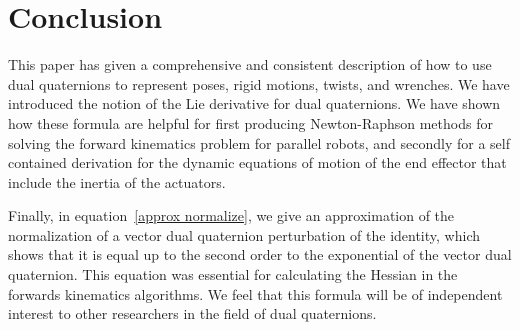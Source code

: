\documentclass[reqno,12pt]{amsart}
\begin{document}
\section{Conclusion}

This paper has given a comprehensive and consistent description of how to use dual quaternions to represent poses, rigid motions, twists, and wrenches.  We have introduced the notion of the Lie derivative for dual quaternions.  We have shown how these formula are helpful for first producing Newton-Raphson methods for solving the forward kinematics problem for parallel robots, and secondly for a self contained derivation for the dynamic equations of motion of the end effector that include the inertia of the actuators.

Finally, in equation~\eqref{approx normalize}, we give an approximation of the normalization of a vector dual quaternion perturbation of the identity, which shows that it is equal up to the second order to the exponential of the vector dual quaternion.  This equation was essential for calculating the Hessian in the forwards kinematics algorithms.  We feel that this formula will be of independent interest to other researchers in the field of dual quaternions.
\end{document}
